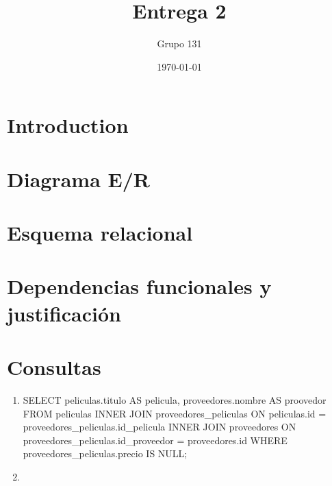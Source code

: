 \documentclass{article}
\title{Entrega 2}
\author{Grupo 131}
\date{\today}
\begin{document}
\maketitle

\section{Introduction}

\section{Diagrama E/R}

\section{Esquema relacional}

\section{Dependencias funcionales y justificación}

\section{Consultas}
\begin{enumerate}
    \item SELECT peliculas.titulo AS pelicula, proveedores.nombre AS proovedor FROM peliculas
    INNER JOIN proveedores\_peliculas ON peliculas.id = proveedores\_peliculas.id\_pelicula
    INNER JOIN proveedores ON proveedores\_peliculas.id\_proveedor = proveedores.id
    WHERE proveedores\_peliculas.precio IS NULL;
    \item
\end{enumerate}
\end{document}
